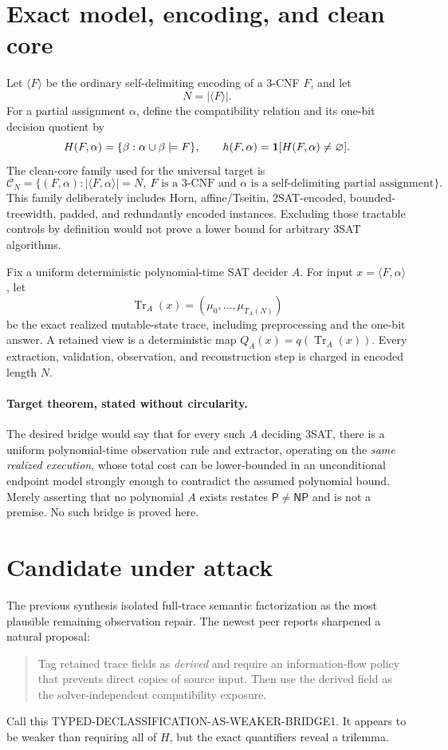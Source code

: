 \documentclass[11pt]{article}
\begin{document}
\section*{Exact model, encoding, and clean core}
Let $\langle F\rangle$ be the ordinary self-delimiting encoding of a 3-CNF
$F$, and let
\[
 N=|\langle F\rangle|.
\]
For a partial assignment $\alpha$, define the compatibility relation and its
one-bit decision quotient by
\[
 H(F,\alpha)=\{\beta: \alpha\cup\beta\models F\},
 \qquad
 h(F,\alpha)={\bf 1}[H(F,\alpha)\ne\varnothing].
\]
The clean-core family used for the universal target is
\[
 \mathcal C_N=\{(F,\alpha): |\langle F,\alpha\rangle|=N,\ F\text{ is a
 3-CNF and }\alpha\text{ is a self-delimiting partial assignment}\}.
\]
This family deliberately includes Horn, affine/Tseitin, 2SAT-encoded,
bounded-treewidth, padded, and redundantly encoded instances.  Excluding those
tractable controls by definition would not prove a lower bound for arbitrary
3SAT algorithms.

Fix a uniform deterministic polynomial-time SAT decider $A$.  For input
$x=\langle F,\alpha\rangle$, let
\[
 \operatorname{Tr}_A(x)=(\mu_0,\ldots,\mu_{T_A(N)})
\]
be the exact realized mutable-state trace, including preprocessing and the
one-bit answer.  A retained view is a deterministic map
$Q_A(x)=q(\operatorname{Tr}_A(x))$.  Every extraction, validation, observation,
and reconstruction step is charged in encoded length $N$.

\paragraph{Target theorem, stated without circularity.}
The desired bridge would say that for every such $A$ deciding 3SAT, there is a
uniform polynomial-time observation rule and extractor, operating on the
\emph{same realized execution}, whose total cost can be lower-bounded in an
unconditional endpoint model strongly enough to contradict the assumed
polynomial bound.  Merely asserting that no polynomial $A$ exists restates
$\mathsf P\ne\mathsf{NP}$ and is not a premise.  No such bridge is proved here.

\section*{Candidate under attack}
The previous synthesis isolated full-trace semantic factorization as the most
plausible remaining observation repair.  The newest peer reports sharpened a
natural proposal:
\begin{quote}
Tag retained trace fields as \emph{derived} and require an information-flow
policy that prevents direct copies of source input.  Then use the derived
field as the solver-independent compatibility exposure.
\end{quote}
Call this
\textsf{TYPED-DECLASSIFICATION-AS-WEAKER-BRIDGE1}.  It appears to be weaker
than requiring all of $H$, but the exact quantifiers reveal a trilemma.
\end{document}
